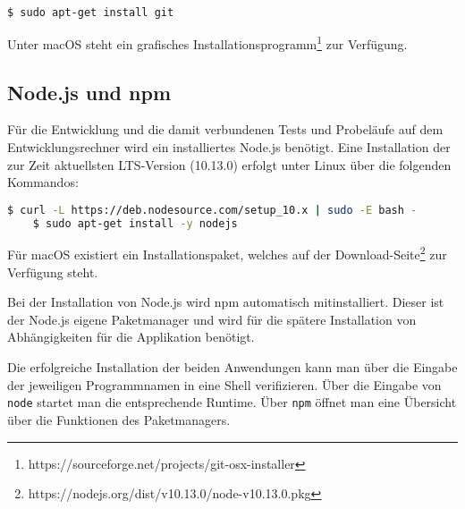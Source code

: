 \begin{lstlisting}[language=bash, caption=Installation von Git, label=ls:vorbereitung_git]
    $ sudo apt-get install git
\end{lstlisting}

Unter macOS steht ein grafisches Installationsprogramm\footnote{https://sourceforge.net/projects/git-osx-installer} zur
Verfügung.

\subsection{Node.js und npm}
Für die Entwicklung und die damit verbundenen Tests und Probeläufe auf dem Entwicklungsrechner wird ein installiertes
Node.js benötigt. Eine Installation der zur Zeit aktuellsten LTS-Version (10.13.0) erfolgt unter Linux über die folgenden
Kommandos:

\begin{lstlisting}[language=bash, caption=Installation von Node.js, label=ls:vorbereitung_nodejs]
    $ curl -L https://deb.nodesource.com/setup_10.x | sudo -E bash -
    $ sudo apt-get install -y nodejs
\end{lstlisting}

Für macOS existiert ein Installationspaket, welches auf der Download-Seite\footnote{https://nodejs.org/dist/v10.13.0/node-v10.13.0.pkg}
zur Verfügung steht.

Bei der Installation von Node.js wird npm automatisch mitinstalliert. Dieser ist der Node.js eigene Paketmanager und
wird für die spätere Installation von Abhängigkeiten für die Applikation benötigt.

Die erfolgreiche Installation der beiden Anwendungen kann man über die Eingabe der jeweiligen Programmnamen in eine Shell
verifizieren. Über die Eingabe von \texttt{node} startet man die entsprechende Runtime. Über \texttt{npm} öffnet man
eine Übersicht über die Funktionen des Paketmanagers.